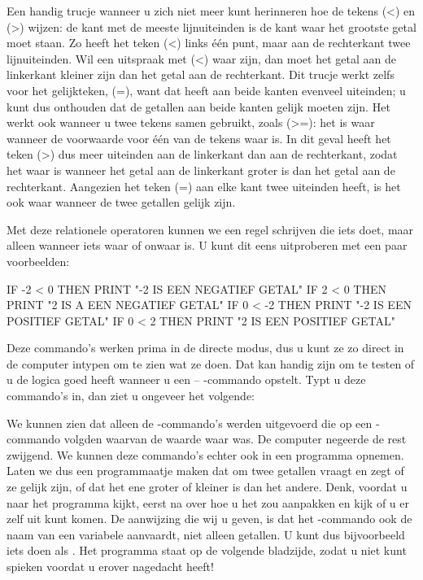 Een handig trucje wanneer u zich niet meer kunt herinneren hoe de tekens \stw(<) en \stw(>) wijzen: de kant met de meeste lijnuiteinden is de kant waar het grootste getal moet staan. Zo heeft het teken \stw(<) links één punt, maar aan de rechterkant twee lijnuiteinden. Wil een uitspraak met \stw(<) waar zijn, dan moet het getal aan de linkerkant kleiner zijn dan het getal aan de rechterkant. Dit trucje werkt zelfs voor het gelijkteken, \stw(=), want dat heeft aan beide kanten evenveel uiteinden; u kunt dus onthouden dat de getallen aan beide kanten gelijk moeten zijn. Het werkt ook wanneer u twee tekens samen gebruikt, zoals \stw(>=): het is waar wanneer de voorwaarde voor één van de tekens waar is. In dit geval heeft het teken \stw(>) dus meer uiteinden aan de linkerkant dan aan de rechterkant, zodat het waar is wanneer het getal aan de linkerkant groter is dan het getal aan de rechterkant. Aangezien het teken \stw(=) aan elke kant twee uiteinden heeft, is het ook waar wanneer de twee getallen gelijk zijn.

\needspace{2cm}
Met deze relationele operatoren kunnen we een regel schrijven die iets doet, maar alleen wanneer iets waar of onwaar is. U kunt dit eens uitproberen met een paar voorbeelden:

\begin{screencode}
  IF -2 < 0 THEN PRINT "-2 IS EEN NEGATIEF GETAL"
  IF 2 < 0 THEN PRINT "2 IS A EEN NEGATIEF GETAL"
  IF 0 < -2 THEN PRINT "-2 IS EEN POSITIEF GETAL"
  IF 0 < 2 THEN PRINT "2 IS EEN POSITIEF GETAL"
\end{screencode}

\needspace{4cm}
Deze commando's werken prima in de directe modus, dus u kunt ze zo direct in de computer intypen om te zien wat ze doen. Dat kan handig zijn om te testen of u de logica goed heeft wanneer u een  -- -commando opstelt. Typt u deze commando's in, dan ziet u ongeveer het volgende:


We kunnen zien dat alleen de -commando's werden uitgevoerd die op een -commando volgden waarvan de waarde waar was. De computer negeerde de rest zwijgend. We kunnen deze commando's echter ook in een programma opnemen. Laten we dus een programmaatje maken dat om twee getallen vraagt en zegt of ze gelijk zijn, of dat het ene groter of kleiner is dan het andere. Denk, voordat u naar het programma kijkt, eerst na over hoe u het zou aanpakken en kijk of u er zelf uit kunt komen. De aanwijzing die wij u geven, is dat het -commando ook de naam van een variabele aanvaardt, niet alleen getallen. U kunt dus bijvoorbeeld iets doen als . Het programma staat op de volgende bladzijde, zodat u niet kunt spieken voordat u erover nagedacht heeft!

